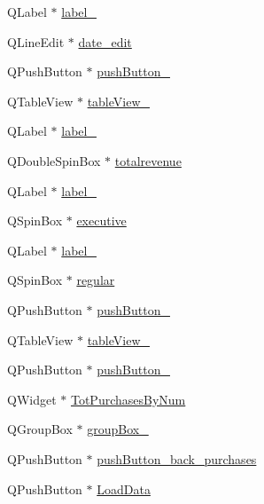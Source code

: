 \begin{DoxyCompactItemize}
Q\+Label $\ast$ \hyperlink{class_ui___main_window_a1c16c0a684617927472e534822a63c7d}{label\+\_}
\item 
Q\+Line\+Edit $\ast$ \hyperlink{class_ui___main_window_a4cba9459c37972e81ff7ecd8dbd768a9}{date\+\_\+edit}
\item 
Q\+Push\+Button $\ast$ \hyperlink{class_ui___main_window_a73935b3c453e1203e6bea365a6564802}{push\+Button\+\_}
\item 
Q\+Table\+View $\ast$ \hyperlink{class_ui___main_window_a1525c0112328522dacbe0b2bfd649ae5}{table\+View\+\_}
\item 
Q\+Label $\ast$ \hyperlink{class_ui___main_window_a882200d8ae16962f5dd3b749ebacbf7e}{label\+\_}
\item 
Q\+Double\+Spin\+Box $\ast$ \hyperlink{class_ui___main_window_ab39c313f32c48bc32df80834effc8c5a}{totalrevenue}
\item 
Q\+Label $\ast$ \hyperlink{class_ui___main_window_ab6ac4329a89041f557332f6569d94493}{label\+\_}
\item 
Q\+Spin\+Box $\ast$ \hyperlink{class_ui___main_window_a81a685104e79be4ec7a43fd16c16e28b}{executive}
\item 
Q\+Label $\ast$ \hyperlink{class_ui___main_window_a1f4ff90c122fededcc08604401442034}{label\+\_}
\item 
Q\+Spin\+Box $\ast$ \hyperlink{class_ui___main_window_a8a42a98981b1b5aed21a260ca21fbe81}{regular}
\item 
Q\+Push\+Button $\ast$ \hyperlink{class_ui___main_window_a8bda6f51c3106d30f53d3254786c8941}{push\+Button\+\_}
\item 
Q\+Table\+View $\ast$ \hyperlink{class_ui___main_window_afded8fe0583c702cde72f46aac2ee997}{table\+View\+\_}
\item 
Q\+Push\+Button $\ast$ \hyperlink{class_ui___main_window_a839fd0686f2c2097cf75b511a125048c}{push\+Button\+\_}
\item 
Q\+Widget $\ast$ \hyperlink{class_ui___main_window_a01ed0a532f90ab9562fb572ae9ea3f55}{Tot\+Purchases\+By\+Num}
\item 
Q\+Group\+Box $\ast$ \hyperlink{class_ui___main_window_a1a1fe5ec77ba52ba39a16db29ff0f91a}{group\+Box\+\_}
\item 
Q\+Push\+Button $\ast$ \hyperlink{class_ui___main_window_a62eadd6f8aa9eecda2baedf9a3ede6da}{push\+Button\+\_\+back\+\_\+purchases}
\item 
Q\+Push\+Button $\ast$ \hyperlink{class_ui___main_window_a9f9b5eed02f2ff651cecce886636b7a8}{Load\+Data}
\item 

\end{DoxyCompactItemize}
